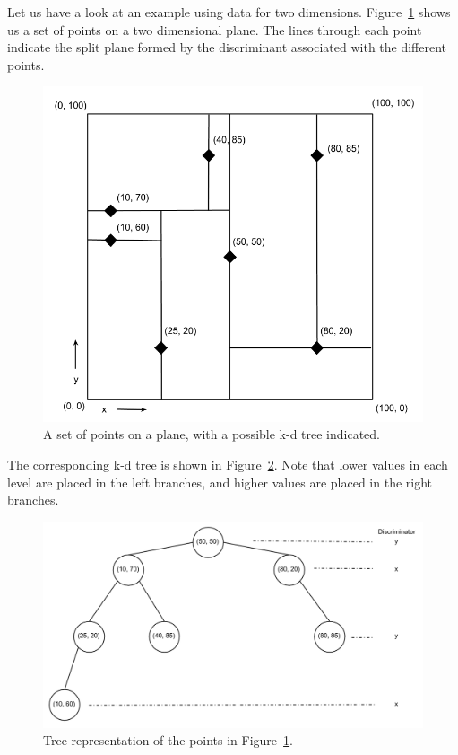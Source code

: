 Let us have a look at an example using data for two dimensions. Figure~\ref{fig:kd_tree_2d_plane} shows us a set of points on a two dimensional plane. The lines through each point indicate the split plane formed by the discriminant associated with the different points.

\begin{figure}[ht!]
    \centering
    \includegraphics[width=120mm]{../gfx/kd_tree_illustration_graph.png}
    \caption{A set of points on a plane, with a possible k-d tree indicated.}
    \label{fig:kd_tree_2d_plane}
\end{figure}

The corresponding k-d tree is shown in Figure~\ref{fig:kd_tree_2d}. Note that lower values in each level are placed in the left branches, and higher values are placed in the right branches.

\begin{figure}[ht!]
    \centering
    \includegraphics[width=120mm]{../gfx/kd_tree_illustration_tree.png}
    \caption{Tree representation of the points in Figure~\ref{fig:kd_tree_2d_plane}.}
    \label{fig:kd_tree_2d}
\end{figure}

